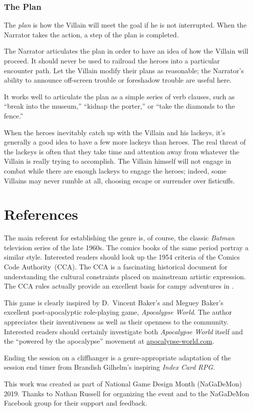 \documentclass[letterpaper]{report}
\begin{document}
\subsection*{The Plan}

The \emph{plan} is how the Villain will meet the goal if he
is not interrupted.
When the Narrator takes the  action,
a step of the plan is completed.

The Narrator articulates the plan in order to have
an idea of how the Villain will proceed. It should never be used
to railroad the heroes into a particular encounter path. Let the Villain
modify their plans as reasonable; the Narrator's ability to announce
off-screen trouble or foreshadow trouble are useful here.

It works well to articulate the plan as a simple series of verb
clauses, such as ``break into the museum,'' ``kidnap the porter,''
or ``take the diamonds to the fence.''

When the heroes inevitably catch up with the Villain and his lackeys,
it's generally a good idea to have a few more lackeys than heroes.
The real threat of the lackeys is often that they take time and attention
away from whatever the Villain is really trying to accomplish.
The Villain himself will not engage in combat while there are
enough lackeys to engage the heroes; indeed, some Villains may
never rumble at all, choosing escape or surrender over fisticuffs.


\chapter{References}

The main referent for establishing the genre is, of course,
the classic \textit{Batman} television series of the late 1960s.
The comics books of the same period portray a similar style.
Interested readers should look up the 1954 criteria of the
Comics Code Authority~(CCA). The CCA is a fascinating historical
document for understanding the cultural constraints placed on
mainstream artistic expression. The CCA rules actually provide
an excellent basis for campy adventures in \kapow{}.

This game is clearly inspired by D.\ Vincent Baker's and Meguey
Baker's excellent post-apocalyptic role-playing game,
\textit{Apocalypse World}. The author appreciates their inventiveness
as well as their openness to the community.
Interested readers should certainly investigate both
\textit{Apocalypse World} itself and the ``powered by the apocalypse''
movement at \url{apocalypse-world.com}.

Ending the session on a cliffhanger is a genre-appropriate
adaptation of the session end timer from
Brandish Gilhelm's inspiring \textit{Index Card RPG}.

This work was created as part of National Game Design Month (NaGaDeMon)
2019. Thanks to Nathan Russell for organizing the event and to the
NaGaDeMon Facebook group for their support and feedback.
\end{document}
